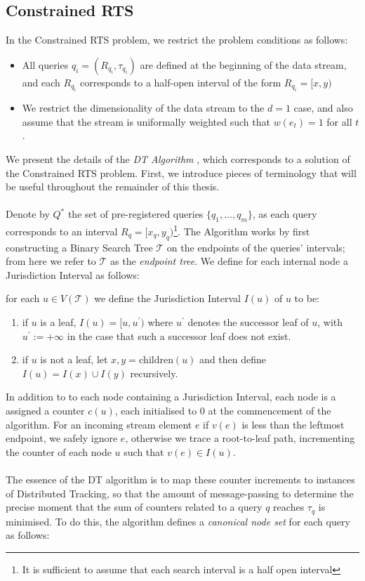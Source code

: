 
\subsection{Constrained RTS}
In the Constrained RTS problem, we restrict the problem conditions as follows: 
\begin{itemize}
    \item  All queries $q_i = (R_{q_i}, \tau_{q_i})$ are defined at the beginning of the data stream, and each $R_{q_i}$ corresponds to a half-open interval of the form $R_{q_i} = [x,y)$
    \item We restrict the dimensionality of the data stream to the $d=1$ case, and also assume that the stream is uniformally weighted such that $w(e_t) = 1$ for all $t$. 
\end{itemize}
We present the details of the \textit{DT Algorithm} \cite{Gan}, which corresponds to a solution of the Constrained RTS problem. First, we introduce pieces of terminology that will be useful throughout the remainder of this thesis. \\
\\
Denote by $Q^*$ the set of pre-registered queries $\{q_1, \dots, q_m\}$, as each query corresponds to an interval $R_q = [x_q,y_q)$\footnote{It is sufficient to assume that each search interval is a half open interval}. The Algorithm works by first constructing a Binary Search Tree $\mathcal{T}$ on the endpoints of the queries' intervals; from here we refer to $\mathcal{T}$ as the \textit{endpoint tree}. We define for each internal node a Jurisdiction Interval as follows: 

\begin{definition}
    for each $u\in V(\mathcal{T})$ we define the Jurisdiction Interval $I(u)$ of $u$ to be: 
    \begin{enumerate}
        \item if $u$ is a leaf, $I(u) = [u,u^\prime)$ where $u^\prime$ denotes the successor leaf of $u$, with $u^\prime := +\infty$ in the case that such a successor leaf does not exist. 
        \item if $u$ is not a leaf, let $x,y = \text{children}(u)$ and then define $I(u) = I(x) \cup I(y)$ recursively.
    \end{enumerate}
\end{definition}
In addition to to each node containing a Jurisdiction Interval, each node is a assigned a counter $c(u)$, each initialised to 0 at the commencement of the algorithm. For an incoming stream element $e$ if $v(e)$ is less than the leftmost endpoint, we safely ignore $e$, otherwise we trace a root-to-leaf path, incrementing the counter of each node $u$ such that $v(e)\in I(u)$. \\
\\
The essence of the DT algorithm is to map these counter increments to instances of Distributed Tracking, so that the amount of message-passing to determine the precise moment that the sum of counters related to a query $q$ reaches $\tau_q$ is minimised. To do this, the algorithm defines a \textit{canonical node set} for each query as follows: 


